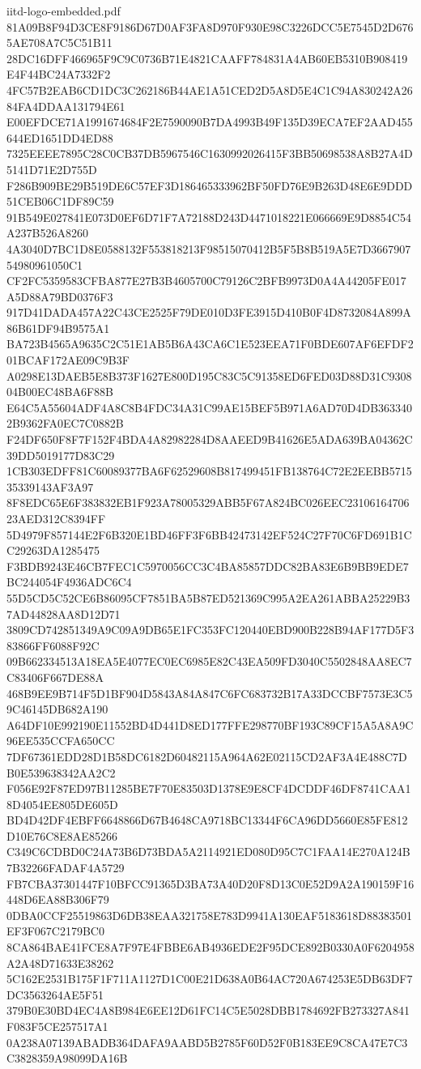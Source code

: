 \begin{filecontents*}[overwrite]{iitd-logo-embedded.pdf}
81A09B8F94D3CE8F9186D67D0AF3FA8D970F930E98C3226DCC5E7545D2D6765AE708A7C5C51B11
28DC16DFF466965F9C9C0736B71E4821CAAFF784831A4AB60EB5310B908419E4F44BC24A7332F2
4FC57B2EAB6CD1DC3C262186B44AE1A51CED2D5A8D5E4C1C94A830242A2684FA4DDAA131794E61
E00EFDCE71A1991674684F2E7590090B7DA4993B49F135D39ECA7EF2AAD455644ED1651DD4ED88
7325EEEE7895C28C0CB37DB5967546C1630992026415F3BB50698538A8B27A4D5141D71E2D755D
F286B909BE29B519DE6C57EF3D186465333962BF50FD76E9B263D48E6E9DDD51CEB06C1DF89C59
91B549E027841E073D0EF6D71F7A72188D243D4471018221E066669E9D8854C54A237B526A8260
4A3040D7BC1D8E0588132F553818213F98515070412B5F5B8B519A5E7D366790754980961050C1
CF2FC5359583CFBA877E27B3B4605700C79126C2BFB9973D0A4A44205FE017A5D88A79BD0376F3
917D41DADA457A22C43CE2525F79DE010D3FE3915D410B0F4D8732084A899A86B61DF94B9575A1
BA723B4565A9635C2C51E1AB5B6A43CA6C1E523EEA71F0BDE607AF6EFDF201BCAF172AE09C9B3F
A0298E13DAEB5E8B373F1627E800D195C83C5C91358ED6FED03D88D31C930804B00EC48BA6F88B
E64C5A55604ADF4A8C8B4FDC34A31C99AE15BEF5B971A6AD70D4DB3633402B9362FA0EC7C0882B
F24DF650F8F7F152F4BDA4A82982284D8AAEED9B41626E5ADA639BA04362C39DD5019177D83C29
1CB303EDFF81C60089377BA6F62529608B817499451FB138764C72E2EEBB571535339143AF3A97
8F8EDC65E6F383832EB1F923A78005329ABB5F67A824BC026EEC2310616470623AED312C8394FF
5D4979F857144E2F6B320E1BD46FF3F6BB42473142EF524C27F70C6FD691B1CC29263DA1285475
F3BDB9243E46CB7FEC1C5970056CC3C4BA85857DDC82BA83E6B9BB9EDE7BC244054F4936ADC6C4
55D5CD5C52CE6B86095CF7851BA5B87ED521369C995A2EA261ABBA25229B37AD44828AA8D12D71
3809CD742851349A9C09A9DB65E1FC353FC120440EBD900B228B94AF177D5F383866FF6088F92C
09B662334513A18EA5E4077EC0EC6985E82C43EA509FD3040C5502848AA8EC7C83406F667DE88A
468B9EE9B714F5D1BF904D5843A84A847C6FC683732B17A33DCCBF7573E3C59C46145DB682A190
A64DF10E992190E11552BD4D441D8ED177FFE298770BF193C89CF15A5A8A9C96EE535CCFA650CC
7DF67361EDD28D1B58DC6182D60482115A964A62E02115CD2AF3A4E488C7DB0E539638342AA2C2
F056E92F87ED97B11285BE7F70E83503D1378E9E8CF4DCDDF46DF8741CAA18D4054EE805DE605D
BD4D42DF4EBFF6648866D67B4648CA9718BC13344F6CA96DD5660E85FE812D10E76C8E8AE85266
C349C6CDBD0C24A73B6D73BDA5A2114921ED080D95C7C1FAA14E270A124B7B32266FADAF4A5729
FB7CBA37301447F10BFCC91365D3BA73A40D20F8D13C0E52D9A2A190159F16448D6EA88B306F79
0DBA0CCF25519863D6DB38EAA321758E783D9941A130EAF5183618D88383501EF3F067C2179BC0
8CA864BAE41FCE8A7F97E4FBBE6AB4936EDE2F95DCE892B0330A0F6204958A2A48D71633E38262
5C162E2531B175F1F711A1127D1C00E21D638A0B64AC720A674253E5DB63DF7DC3563264AE5F51
379B0E30BD4EC4A8B984E6EE12D61FC14C5E5028DBB1784692FB273327A841F083F5CE257517A1
0A238A07139ABADB364DAFA9AABD5B2785F60D52F0B183EE9C8CA47E7C3C3828359A98099DA16B

\end{filecontents*}
